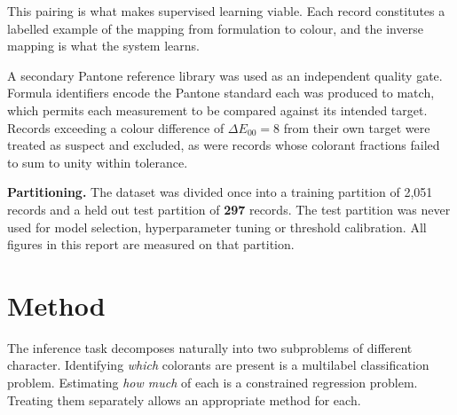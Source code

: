 \documentclass[11pt,a4paper]{article}
\newcommand{\keyfig}[1]{\textcolor{accent}{\textbf{#1}}}
\newcommand{\calloutcolour}{softbg}
\newenvironment{callout}[1][softbg]
  {\renewcommand{\calloutcolour}{#1}%
   \begin{lrbox}{\calloutbox}%
   \begin{minipage}{\dimexpr\textwidth-2\fboxsep-2\fboxrule\relax}%
   \vspace{2pt}}
  {\vspace{2pt}%
   \end{minipage}%
   \end{lrbox}%
   \begin{center}\colorbox{\calloutcolour}{\usebox{\calloutbox}}\end{center}}
\begin{document}
This pairing is what makes supervised learning viable. Each record constitutes a
labelled example of the mapping from formulation to colour, and the inverse
mapping is what the system learns.

A secondary Pantone reference library was used as an independent quality gate.
Formula identifiers encode the Pantone standard each was produced to match, which
permits each measurement to be compared against its intended target. Records
exceeding a colour difference of $\Delta E_{00} = 8$ from their own target were
treated as suspect and excluded, as were records whose colorant fractions failed
to sum to unity within tolerance.

\begin{callout}
\textbf{Partitioning.} The dataset was divided once into a training partition of
2{,}051 records and a held out test partition of \keyfig{297} records. The test
partition was never used for model selection, hyperparameter tuning or threshold
calibration. All figures in this report are measured on that partition.
\end{callout}

\section{Method}

The inference task decomposes naturally into two subproblems of different
character. Identifying \emph{which} colorants are present is a multilabel
classification problem. Estimating \emph{how much} of each is a constrained
regression problem. Treating them separately allows an appropriate method for
each.

\begin{center}
\end{center}
\end{document}
